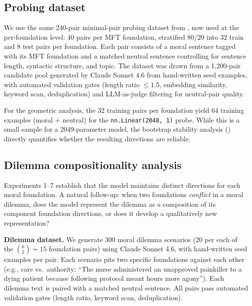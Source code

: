 \subsection{Probing dataset}\label{probing-dataset}

We use the same 240-pair minimal-pair probing dataset from
\citet{reblitzrichardson2026fragility}, now used at the
per-foundation level: 40 pairs per MFT foundation, stratified
80/20 into 32 train and 8 test pairs per foundation. Each pair
consists of a moral sentence tagged with its MFT foundation and a
matched neutral sentence controlling for sentence length, syntactic
structure, and topic. The dataset was drawn from a 1,200-pair
candidate pool generated by Claude Sonnet 4.6 from hand-written
seed examples, with automated validation gates (length ratio \(\leq
1.5\), embedding similarity, keyword scan, deduplication) and
LLM-as-judge filtering for neutral-pair quality.

For the geometric analysis, the 32 training pairs per foundation
yield \(64\) training examples (moral + neutral) for the
\texttt{nn.Linear(2048,\ 1)} probe. While this is a small sample for a
2049-parameter model, the bootstrap stability analysis ()
directly quantifies whether the resulting directions are reliable.

\subsection{Dilemma compositionality analysis}\label{dilemma-compositionality-analysis}

Experiments 1--7 establish that the model maintains distinct
directions for each moral foundation. A natural follow-up: when
two foundations \emph{conflict} in a moral dilemma, does the model
represent the dilemma as a composition of its component foundation
directions, or does it develop a qualitatively new representation?

\textbf{Dilemma dataset.} We generate 300 moral dilemma scenarios (20
per each of the \(\binom{6}{2} = 15\) foundation pairs) using
Claude Sonnet 4.6, with hand-written seed examples per pair. Each
scenario pits two specific foundations against each other (e.g.,
care vs.~authority: ``The nurse administered an unapproved
painkiller to a dying patient because following protocol meant
hours more agony''). Each dilemma text is paired with a matched
neutral sentence. All pairs pass automated validation gates
(length ratio, keyword scan, deduplication).

